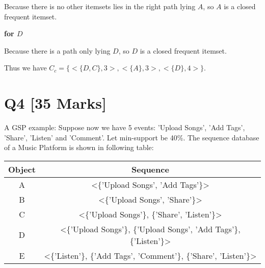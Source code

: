 \documentclass[en,black,normal,10pt]{elegantnote}
\begin{document}
Because there is no other itemsets lies in the right path lying $A$, so $A$ is a closed frequent itemset.

\textbf{for $D$}


Because there is a path only lying $D$, so $D$ is a closed frequent itemset.

Thus we have $C_c = \{ <\{D, C\},3>, <\{A\},3>, <\{D\},4>\}$. 

\newpage

\section*{Q4 [35 Marks]}

A GSP example: Suppose now we have 5 events: 'Upload Songs', 'Add Tags', 'Share', 'Listen' and 'Comment'.
Let min-support be 40\%.
The sequence database of a Music Platform is shown in following table:

\begin{tabular}{|c|c|}
  \hline
    \rowcolor{Gray} %
    Object & Sequence \\
    \hline
    A & <\{'Upload Songs', 'Add Tags'\}> \\
    \hline
    B & <\{'Upload Songs', 'Share'\}> \\
    \hline
    C & <\{'Upload Songs'\}, \{'Share', 'Listen'\}> \\
    \hline
    D & <\{'Upload Songs'\}, \{'Upload Songs', 'Add Tags'\}, \{'Listen'\}> \\
    \hline
    E & <\{'Listen'\}, \{'Add Tags', 'Comment'\}, \{'Share', 'Listen'\}> \\
    \hline
\end{tabular}
\end{document}
